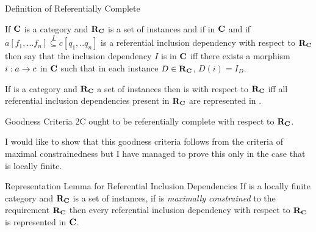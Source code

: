 \begin{frame}{Definition of Referentially Complete}
\begin{definition}
If $\textbf{C}$ is a category and $\textbf{R}_{\textbf{C}}$ is a set of instances and if
\fnsourceqnsource
in $\textbf{C}$ and if $a[f_1,...f_n] \overset{I}{\subseteq} c[q_1,..q_n]$ is a referential inclusion dependency
with respect  to $\textbf{R}_{\textbf{C}}$ then say that the inclusion dependency $I$ is  in $\textbf{C}$
iff there exists a morphism $i:a \rightarrow c$ in $\textbf{C}$ such that in each instance $D \in \textbf{R}_{\textbf{C}}$, $D(i) = I_D$. 
\end{definition}
If \catcw is a category and $\textbf{R}_{\textbf{C}}$ a set of instances then 
\catcw is  with respect to $\textbf{R}_{\textbf{C}}$ 
iff all referential inclusion dependencies present in $\textbf{R}_{\textbf{C}}$ are represented in \catc.
\end{frame}

\begin{frame}{Goodness Criteria 2C}
 \IfSforCwithRCwords 
\catcw ought to be referentially complete with respect to $\textbf{R}_{\textbf{C}}$.

I would like to show that this goodness criteria follows from the criteria of maximal constrainedness
but I have managed to prove this only in the case that \catcw is locally finite. 
\end{frame}

\begin{frame}{Representation Lemma for Referential Inclusion Dependencies}
If \catcw is a locally finite category and $\textbf{R}_{\textbf{C}}$ is a set of instances, if \catcw is 
\textit{maximally constrained} to the requirement $\textbf{R}_{\textbf{C}}$ then
every referential inclusion dependency with respect to $\textbf{R}_{\textbf{C}}$ is represented in $\textbf{C}$.
\end{frame}

